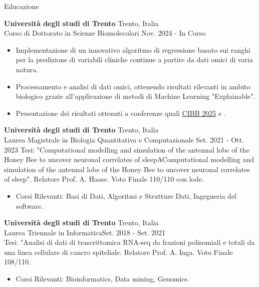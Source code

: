 \documentclass{resume} %
\begin{document}
\begin{rSection}{Educazione}


{\bf Universit\`a degli studi di Trento} \hfill {Trento, Italia}\\
Corso di Dottorato in Scienze Biomolecolari \hfill {Nov. 2024 - In Corso}
\begin{itemize}
   \item Implementazione di un innovativo algoritmo di regressione basato sui ranghi per la predizione di variabili cliniche continue a partire da dati omici di varia natura.
   \item Processamento e analisi di dati omici, ottenendo risultati rilevanti in ambito biologico grazie all'applicazione di metodi di Machine Learning "Explainable".
   \item Presentazione dei risultati ottenuti a conferenze quali \href{https://www.bioinformatics.polimi.it/CIBB2025/}{CIBB 2025} e .
\end{itemize}

{\bf Universit\`a degli studi di Trento} \hfill {Trento, Italia}\\
Laurea Magistrale in Biologia Quantitativa e Computazionale \hfill {Set. 2021 - Ott. 2023}
Tesi: "Computational modelling and simulation of the antennal lobe of the Honey Bee to uncover neuronal correlates of sleepAComputational modelling and simulation of the antennal lobe of the Honey Bee to uncover neuronal correlates of sleep". Relatore Prof. A. Haase. Voto Finale 110/110 con lode.
\begin{itemize}
   \item Corsi Rilevanti: Basi di Dati, Algoritmi e Strutture Dati, Ingegneria del software.
\end{itemize}

{\bf Universit\`a degli studi di Trento} \hfill {Trento, Italia}\\
Laurea Triennale in Informatica\hfill {Set. 2018 - Set. 2021}\\
Tesi: "Analisi di dati di trascrittomica RNA-seq da frazioni polisomiali e totali da una linea cellulare di cancro epiteliale. Relatore Prof. A. Inga. Voto Finale 108/110.
\begin{itemize}
   \item Corsi Rilevanti: Bioinformatics, Data mining, Genomics.
\end{itemize}


\end{rSection}
\end{document}
